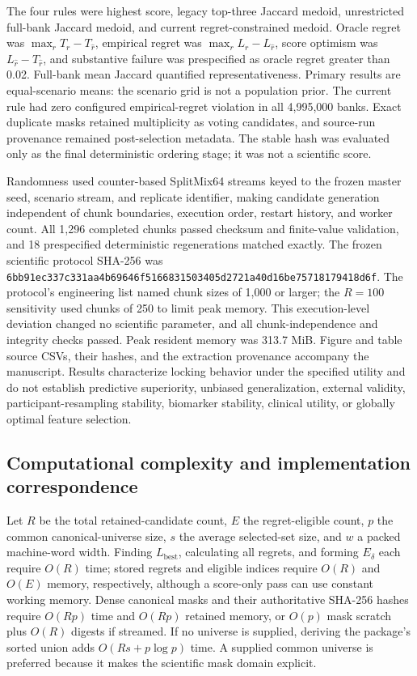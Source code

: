 The four rules were highest score, legacy top-three Jaccard medoid, unrestricted full-bank Jaccard medoid, and current regret-constrained medoid. Oracle regret was $\max_rT_r-T_{\widehat r}$, empirical regret was $\max_rL_r-L_{\widehat r}$, score optimism was $L_{\widehat r}-T_{\widehat r}$, and substantive failure was prespecified as oracle regret greater than 0.02. Full-bank mean Jaccard quantified representativeness. Primary results are equal-scenario means: the scenario grid is not a population prior. The current rule had zero configured empirical-regret violation in all 4,995,000 banks. Exact duplicate masks retained multiplicity as voting candidates, and source-run provenance remained post-selection metadata. The stable hash was evaluated only as the final deterministic ordering stage; it was not a scientific score.

Randomness used counter-based SplitMix64 streams keyed to the frozen master seed, scenario stream, and replicate identifier, making candidate generation independent of chunk boundaries, execution order, restart history, and worker count. All 1,296 completed chunks passed checksum and finite-value validation, and 18 prespecified deterministic regenerations matched exactly. The frozen scientific protocol SHA-256 was \texttt{6bb91ec337c331aa4b69646f5166831503405d2721a40d16be75718179418d6f}. The protocol's engineering list named chunk sizes of 1,000 or larger; the $R=100$ sensitivity used chunks of 250 to limit peak memory. This execution-level deviation changed no scientific parameter, and all chunk-independence and integrity checks passed. Peak resident memory was 313.7 MiB. Figure and table source CSVs, their hashes, and the extraction provenance accompany the manuscript. Results characterize locking behavior under the specified utility and do not establish predictive superiority, unbiased generalization, external validity, participant-resampling stability, biomarker stability, clinical utility, or globally optimal feature selection.

\subsection{Computational complexity and implementation correspondence}

Let $R$ be the total retained-candidate count, $E$ the regret-eligible count, $p$ the common canonical-universe size, $s$ the average selected-set size, and $w$ a packed machine-word width. Finding $L_{\mathrm{best}}$, calculating all regrets, and forming $E_\delta$ each require $O(R)$ time; stored regrets and eligible indices require $O(R)$ and $O(E)$ memory, respectively, although a score-only pass can use constant working memory. Dense canonical masks and their authoritative SHA-256 hashes require $O(Rp)$ time and $O(Rp)$ retained memory, or $O(p)$ mask scratch plus $O(R)$ digests if streamed. If no universe is supplied, deriving the package's sorted union adds $O(Rs+p\log p)$ time. A supplied common universe is preferred because it makes the scientific mask domain explicit.

